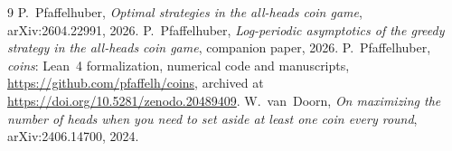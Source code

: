 \documentclass[11pt]{article}
\theoremstyle{definition}
\begin{document}
\begin{thebibliography}{9}
  P.~Pfaffelhuber,
  \emph{Optimal strategies in the all-heads coin game},
  arXiv:2604.22991, 2026.
  P.~Pfaffelhuber,
  \emph{Log-periodic asymptotics of the greedy strategy in the
  all-heads coin game},
  companion paper, 2026.
  P.~Pfaffelhuber,
  \emph{coins}: Lean~4 formalization, numerical code and manuscripts,
  \url{https://github.com/pfaffelh/coins}, archived at
  \url{https://doi.org/10.5281/zenodo.20489409}.
  W.~van~Doorn,
  \emph{On maximizing the number of heads when you need to set aside at
  least one coin every round},
  arXiv:2406.14700, 2024.
\end{thebibliography}
\end{document}
